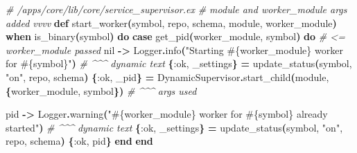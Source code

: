 \documentclass[
  oneside]{book}
\newenvironment{Shaded}{\begin{snugshade}}{\end{snugshade}}
\newcommand{\CommentTok}[1]{\textcolor[rgb]{0.56,0.35,0.01}{\textit{#1}}}
\newcommand{\ConstantTok}[1]{\textcolor[rgb]{0.56,0.35,0.01}{#1}}
\newcommand{\FunctionTok}[1]{\textcolor[rgb]{0.13,0.29,0.53}{\textbf{#1}}}
\newcommand{\KeywordTok}[1]{\textcolor[rgb]{0.13,0.29,0.53}{\textbf{#1}}}
\newcommand{\NormalTok}[1]{#1}
\newcommand{\OperatorTok}[1]{\textcolor[rgb]{0.81,0.36,0.00}{\textbf{#1}}}
\newcommand{\OtherTok}[1]{\textcolor[rgb]{0.56,0.35,0.01}{#1}}
\newcommand{\StringTok}[1]{\textcolor[rgb]{0.31,0.60,0.02}{#1}}
\newcommand{\VariableTok}[1]{\textcolor[rgb]{0.00,0.00,0.00}{#1}}
\begin{document}
\begin{Shaded}
\begin{Highlighting}[]
  \CommentTok{\# /apps/core/lib/core/service\_supervisor.ex}
  \CommentTok{\# module and worker\_module args added vvvv}
  \KeywordTok{def}\NormalTok{ start\_worker}\FunctionTok{(}\NormalTok{symbol, repo, schema, module, worker\_module}\FunctionTok{)}
      \KeywordTok{when}\NormalTok{ is\_binary}\FunctionTok{(}\NormalTok{symbol}\FunctionTok{)} \KeywordTok{do}
    \KeywordTok{case}\NormalTok{ get\_pid}\FunctionTok{(}\NormalTok{worker\_module, symbol}\FunctionTok{)} \KeywordTok{do} \CommentTok{\# \textless{}= worker\_module passed}
      \ConstantTok{nil} \OperatorTok{{-}\textgreater{}}
        \ConstantTok{Logger}\OperatorTok{.}\NormalTok{info}\FunctionTok{(}\StringTok{"Starting }\OtherTok{\#\{}\NormalTok{worker\_module}\OtherTok{\}}\StringTok{ worker for }\OtherTok{\#\{}\NormalTok{symbol}\OtherTok{\}}\StringTok{"}\FunctionTok{)}
                      \CommentTok{\# \^{}\^{}\^{} dynamic text}
        \FunctionTok{\{}\VariableTok{:ok}\NormalTok{, \_settings}\FunctionTok{\}} \OperatorTok{=}\NormalTok{ update\_status}\FunctionTok{(}\NormalTok{symbol, }\StringTok{"on"}\NormalTok{, repo, schema}\FunctionTok{)}
        \FunctionTok{\{}\VariableTok{:ok}\NormalTok{, \_pid}\FunctionTok{\}} \OperatorTok{=} \ConstantTok{DynamicSupervisor}\OperatorTok{.}\NormalTok{start\_child}\FunctionTok{(}\NormalTok{module, }\FunctionTok{\{}\NormalTok{worker\_module, symbol}\FunctionTok{\})}
                                                              \CommentTok{\# \^{}\^{}\^{} args used}

\NormalTok{      pid }\OperatorTok{{-}\textgreater{}}
        \ConstantTok{Logger}\OperatorTok{.}\NormalTok{warning}\FunctionTok{(}\StringTok{"}\OtherTok{\#\{}\NormalTok{worker\_module}\OtherTok{\}}\StringTok{ worker for }\OtherTok{\#\{}\NormalTok{symbol}\OtherTok{\}}\StringTok{ already started"}\FunctionTok{)}
                        \CommentTok{\# \^{}\^{}\^{} dynamic text}
        \FunctionTok{\{}\VariableTok{:ok}\NormalTok{, \_settings}\FunctionTok{\}} \OperatorTok{=}\NormalTok{ update\_status}\FunctionTok{(}\NormalTok{symbol, }\StringTok{"on"}\NormalTok{, repo, schema}\FunctionTok{)}
        \FunctionTok{\{}\VariableTok{:ok}\NormalTok{, pid}\FunctionTok{\}}
    \KeywordTok{end}
  \KeywordTok{end}


\end{Highlighting}
\end{Shaded}
\end{document}

